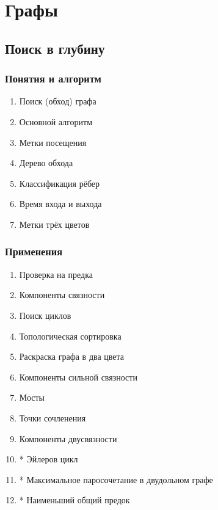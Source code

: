\documentclass[a4paper,12pt]{article}
\begin{document}
  \section{Графы}

    \subsection{Поиск в глубину}

      \subsubsection{Понятия и алгоритм}
        \begin{enumerate}
          \item Поиск (обход) графа
          \item Основной алгоритм
          \item Метки посещения
          \item Дерево обхода
          \item Классификация рёбер
          \item Время входа и выхода
          \item Метки трёх цветов
        \end{enumerate}

      \subsubsection{Применения}
        \begin{enumerate}
          \item Проверка на предка
          \item Компоненты связности
          \item Поиск циклов
          \item Топологическая сортировка
          \item Раскраска графа в два цвета
          \item Компоненты сильной связности
          \item Мосты
          \item Точки сочленения
          \item Компоненты двусвязности
          \item * Эйлеров цикл
          \item * Максимальное паросочетание в двудольном графе
          \item * Наименьший общий предок
        \end{enumerate}
 
\end{document}
